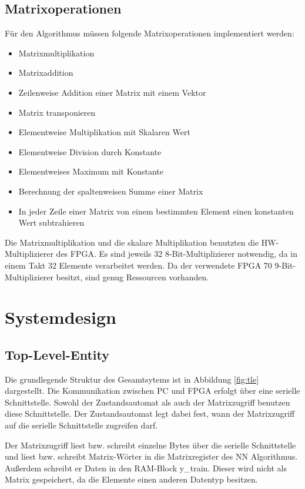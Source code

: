 \documentclass
[ 12pt,
  parskip=half %
]{scrreprt}
\begin{document}
\subsection{Matrixoperationen}

Für den Algorithmus müssen folgende Matrixoperationen implementiert werden:
\begin{itemize}
	\item Matrixmultiplikation
	\item Matrixaddition
	\item Zeilenweise Addition einer Matrix mit einem Vektor 
	\item Matrix transponieren
	\item Elementweise Multiplikation mit Skalaren Wert
	\item Elementweise Division durch Konstante
	\item Elementweises Maximum mit Konstante 
	\item Berechnung der spaltenweisen Summe einer Matrix
	\item In jeder Zeile einer Matrix von einem bestimmten Element einen konstanten Wert subtrahieren
\end{itemize}

Die Matrixmultiplikation und die skalare Multiplikation benutzten die HW-Multiplizierer des FPGA. Es sind jeweils 32 8-Bit-Multiplizierer notwendig, da in einem Takt 32 Elemente verarbeitet werden. Da der verwendete FPGA 70 9-Bit-Multiplizierer besitzt, sind genug Ressourcen vorhanden.

\section{Systemdesign}

\subsection{Top-Level-Entity}

Die grundlegende Struktur des Gesamtsytems ist in Abbildung \ref{fig:tle} dargestellt. Die Kommunikation zwischen PC und FPGA erfolgt über eine serielle Schnittstelle. Sowohl der Zustandsautomat als auch der Matrixzugriff benutzen diese Schnittstelle. Der Zustandsautomat legt dabei fest, wann der Matrixzugriff auf die serielle Schnittstelle zugreifen darf.

Der Matrixzugriff liest bzw. schreibt einzelne Bytes über die serielle Schnittstelle und liest bzw. schreibt Matrix-Wörter in die Matrixregister des NN Algorithmus. Außerdem schreibt er Daten in den RAM-Block y\_train. Dieser wird nicht als Matrix gespeichert, da die Elemente einen anderen Datentyp besitzen.
\end{document}
